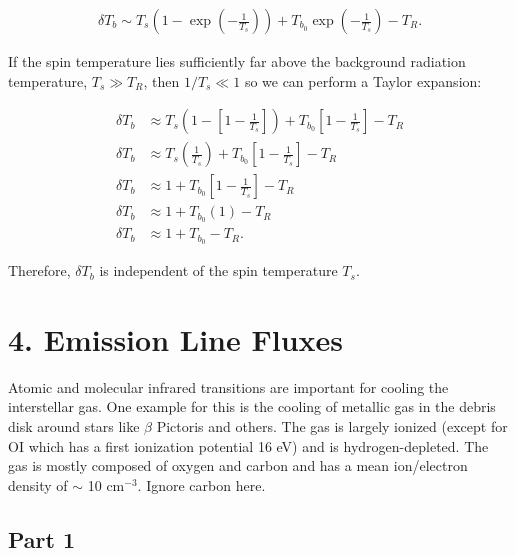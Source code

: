 \documentclass[12pt]{article}
\begin{document}
\begin{align*}
\delta T_b \sim T_s\left(1-\exp\left(-\frac{1}{T_s}\right)\right) + T_{b_0}\exp\left(-\frac{1}{T_s}\right) - T_R.
\end{align*}

If the spin temperature lies sufficiently far above the background radiation temperature, $T_s \gg T_R$, then $1/T_s \ll 1$ so we can perform a Taylor expansion:

\begin{equation*}
\begin{split}
\delta T_b &\approx T_s\left(1-\left[1-\frac{1}{T_s}\right]\right) + T_{b_0}\left[1-\frac{1}{T_s}\right] - T_R\\
\delta T_b &\approx T_s\left(\frac{1}{T_s}\right) + T_{b_0}\left[1-\frac{1}{T_s}\right] - T_R\\
\delta T_b &\approx 1 + T_{b_0}\left[1-\frac{1}{T_s}\right] - T_R\\
\delta T_b &\approx 1 + T_{b_0}(1) - T_R\\
\delta T_b &\approx 1 + T_{b_0} - T_R.
\end{split}
\end{equation*}

Therefore, $\delta T_b$ is independent of the spin temperature $T_s$.


\section*{4. Emission Line Fluxes}

Atomic and molecular infrared transitions are important for cooling the interstellar gas. One example for this is the cooling of metallic gas in the debris disk around
stars like $\beta$ Pictoris and others. The gas is largely ionized (except for $\mathrm{OI}$ which has a first ionization potential 16 eV) and is hydrogen-depleted. The gas is mostly composed of oxygen and carbon and has a mean ion/electron density of $\sim$ 10 cm$^{-3}$. Ignore carbon here.


\subsection*{Part 1}
\end{document}
